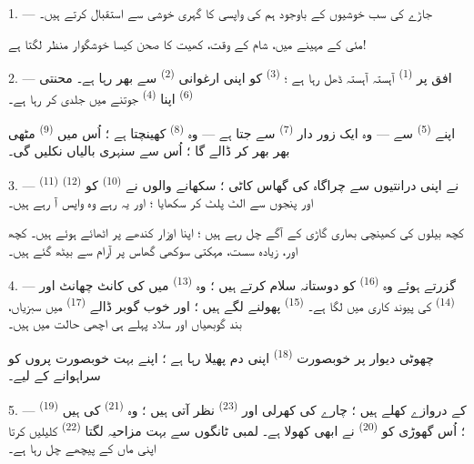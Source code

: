 \VUsaut{3.0mm}
\VUsaut{3.0mm}

\VUsaut{4.0mm}

1. --- جاڑے کی سب خوشیوں کے باوجود ہم  کی واپسی کا گہری
خوشی سے استقبال کرتے ہیں۔

مئی کے مہینے میں، شام کے وقت، کھیت کا صحن کیسا خوشگوار منظر لگتا ہے!

2. --- افق پر  \textsuperscript{(1)} آہستہ آہستہ ڈھل رہا
ہے ؛  \textsuperscript{(3)} کو اپنی ارغوانی
 \textsuperscript{(2)} سے بھر رہا ہے۔ محنتی
 \textsuperscript{(6)} اپنا 
\textsuperscript{(4)} جوتنے میں جلدی کر رہا ہے۔

اپنے  \textsuperscript{(5)} سے — وہ ایک زور دار
 \textsuperscript{(7)} سے جتا ہے — وہ 
\textsuperscript{(8)} کھینچتا ہے ؛ اُس میں 
\textsuperscript{(9)} مٹھی بھر بھر کر  ڈالے گا ؛ اُس سے
سنہری بالیاں نکلیں گی۔

3. ---  \textsuperscript{(11)} نے اپنی
درانتیوں سے چراگاہ کی گھاس کاٹی ؛ سکھانے والوں نے  \textsuperscript{(10)} کو 
\textsuperscript{(12)} اور پنجوں سے الٹ پلٹ کر سکھایا ؛ اور یہ رہے
وہ واپس آ رہے ہیں۔

کچھ بیلوں کی کھینچی بھاری گاڑی کے آگے چل رہے ہیں ؛ اپنا اوزار کندھے
پر اٹھائے ہوئے ہیں۔ کچھ اور، زیادہ سست، مہکتی سوکھی گھاس پر آرام سے
بیٹھ گئے ہیں۔

4. --- گزرتے ہوئے وہ  \textsuperscript{(16)} کو دوستانہ
سلام کرتے ہیں ؛ وہ  \textsuperscript{(13)} میں
 کی کانٹ چھانٹ اور 
\textsuperscript{(14)} کی پیوند کاری میں لگا ہے۔  \textsuperscript{(15)} پھولنے لگے ہیں ؛ اور خوب گوبر ڈالے
 \textsuperscript{(17)} میں سبزیاں، بند گوبھیاں
اور سلاد پہلے ہی اچھی حالت میں ہیں۔

چھوٹی دیوار پر خوبصورت  \textsuperscript{(18)} اپنی دم
پھیلا رہا ہے ؛ اپنے بہت خوبصورت پروں کو سراہوانے کے لیے۔

\VUsaut{3.0mm}

5. ---  \textsuperscript{(19)} کے دروازے کھلے ہیں ؛
چارے کی کھرلی اور  \textsuperscript{(23)} نظر
آتی ہیں ؛ وہ  \textsuperscript{(21)} کی ہیں ؛ اُس گھوڑی
کو  \textsuperscript{(20)} نے ابھی کھولا ہے۔ لمبی
ٹانگوں سے بہت مزاحیہ لگتا  \textsuperscript{(22)}
کلیلیں کرتا اپنی ماں کے پیچھے چل رہا ہے۔


